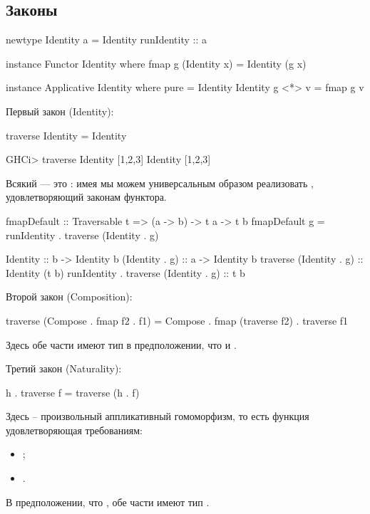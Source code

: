 \documentclass[11pt,a4paper]{article}
\begin{document}
\subsection{Законы}
\begin{hscode}
newtype Identity a = Identity { runIdentity :: a }

instance Functor Identity where
	fmap g (Identity x) = Identity (g x)

instance Applicative Identity where
	pure = Identity
	Identity g <*> v = fmap g v
\end{hscode}
Первый закон (Identity):
\begin{hscode}
traverse Identity = Identity

GHCi> traverse Identity [1,2,3]
Identity [1,2,3]
\end{hscode}
Всякий  --- это : имея  мы можем универсальным образом реализовать , удовлетворяющий законам функтора.
\begin{hscode}
fmapDefault :: Traversable t => (a -> b) -> t a -> t b
fmapDefault g = runIdentity . traverse (Identity . g)
\end{hscode}

\begin{hscode}
Identity :: b -> Identity b
(Identity . g) :: a -> Identity b
traverse (Identity . g) :: Identity (t b)
runIdentity . traverse (Identity . g) :: t b
\end{hscode}
Второй закон (Composition):
\begin{hscode}
traverse (Compose . fmap f2 . f1) = Compose . fmap (traverse f2) . traverse f1
\end{hscode}
Здесь обе части имеют тип  в предположении, что  и .

Третий закон (Naturality):
\begin{hscode}
h . traverse f = traverse (h . f)
\end{hscode}
Здесь  -- произвольный аппликативный гомоморфизм, то есть функция удовлетворяющая требованиям:
\begin{itemize}
	\item {};
	\item {}.
\end{itemize}
В предположении, что , обе части имеют тип .
\end{document}
